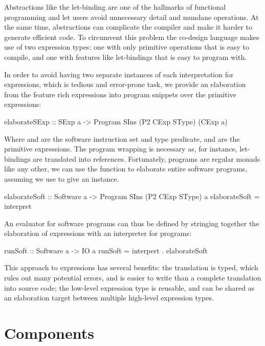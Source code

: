 \documentclass[../paper.tex]{subfiles}
\begin{document}
\noindent Abstractions like the let-binding are one of the hallmarks of functional programming and let users avoid unnecessary detail and mundane operations. At the same time, abstractions can complicate the compiler and make it harder to generate efficient code. To circumvent this problem the co-design language makes use of two expression types: one with only primitive operations that is easy to compile, and one with features like let-bindings that is easy to program with.

In order to avoid having two separate instances of each interpretation for expressions, which is tedious and error-prone task, we provide an elaboration from the feature rich expressions into program snippets over the primitive expressions:

\begin{code}
elaborateSExp :: SExp a -> Program SIns (P2 CExp SType) (CExp a)
\end{code}

\noindent Where  and  are the software instruction set and type predicate, and  are the primitive expressions. The program wrapping is necessary as, for instance, let-bindings are translated into references. Fortunately, programs are regular monads like any other, we can use the  function to elaborate entire software programs, assuming we use  to give an  instance.

\begin{code}
elaborateSoft :: Software a -> Program SIns (P2 CExp SType) a
elaborateSoft = interpret
\end{code}

An evaluator for software programs can thus be defined by stringing together the elaboration of expressions with an interpreter for programs:

\begin{code}
runSoft :: Software a -> IO a
runSoft = interpert . elaborateSoft
\end{code}

This approach to expressions has several benefits: the translation is typed, which rules out many potential errors, and is easier to write than a complete translation into source code; the low-level expression type is reusable, and can be shared as an elaboration target between multiple high-level expression types.

\section{Components}
\end{document}

